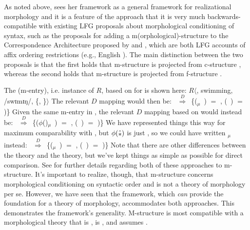 \documentclass[output=paper,hidelinks]{langscibook}
\begin{document}
As noted above, \citet{dalrymple15} sees her framework as a general framework for
realizational morphology and it is a feature of the approach that it
is very much backwards-compatible with existing LFG proposals about
morphological conditioning of syntax, such as the proposals for adding a
m(orphological)-structure to  the Correspondence Architecture proposed by
\citet{buttetal96} and \citet{FrankZaenen2004}, which are both LFG
accounts of affix ordering restrictions (e.g., English ). The main distinction between the two
proposals is that the first holds that m-structure is projected
from c-structure \citep{buttetal96}, whereas the second holds that
m-structure is projected from f-structure \citep{FrankZaenen2004}.

The  (m-entry), i.e. instance of $R$, based
on \citeauthor{buttetal96} for  is shown here:
%
\ea \label{ex:m-entry-swimming}
  $R$$\langle$, swimming, /swɪmɪŋ/, \{,
  \}$\rangle$
\z
%
The relevant $D$ mapping would then be:
%
\ea \label{ex:swimming-butt} \ $\overset{D}{\Rightarrow}$\
  \{(\amother$_\mu$\ ) $=$ , (\UP~) $=$ )\}
\z
%
Given the same m-entry in , the relevant $D$
mapping based on \citeauthor{FrankZaenen2004} would instead be:
%
\ea
{}\ $\overset{D}{\Rightarrow}$\
  \{($\phi$(\amother)$_\mu$\ ) $=$ , (\UP~) $=$ )\}
\z
%
We have represented things this way for maximum comparability with , but
$\phi(\amother)$ is just \Up, so we could have written \Up$_\mu$
instead:
%
\ea
{}\ $\overset{D}{\Rightarrow}$\
  \{(\Up$_\mu$\ ) $=$ , (\UP~) $=$ )\}
\z
%
Note that there are other differences between the
\citeauthor{buttetal96} theory and the \citeauthor{FrankZaenen2004}
theory, but we've kept things as simple as possible for direct
comparison. See \citet{dalrymple15} for further details regarding both
of these approaches to m-structure. It's important to realize, though,
that m-structure concerns morphological conditioning on syntactic
order and is not a theory of morphology per se. However, we have seen
that the \citet{dalrymple15} framework, which \emph{can} provide the
foundation for a theory of morphology, accommodates both
approaches. This demonstrates the \citeauthor{dalrymple15} framework's
generality. M-structure is most compatible with a morphological theory
that is \aterm{lexemic}, is \aterm{Word-and-Paradigm}, and assumes
\aterm{Strong Lexicalism}.
\end{document}
